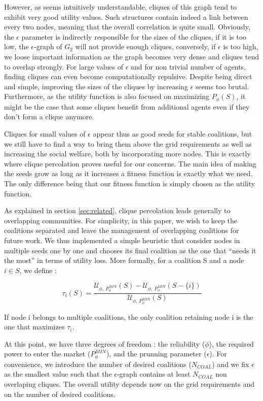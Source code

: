 \documentclass[conference]{IEEEtran}
\begin{document}
However, as seems intuitively understandable, cliques of this graph tend to exhibit very good utility values. Such  structures contain indeed a link between every two nodes, meaning that the overall correlation is quite small. Obviously, the $ \epsilon $ parameter is indirectly responsible for the sizes of the cliques, if it is too low, the $\epsilon$-graph of $ G_{2} $ will not provide enough cliques, conversely, if $\epsilon $ is too high, we loose important information as the graph becomes very dense and cliques tend to overlap strongly. For large values of $ \epsilon $ and for non trivial number of agents, finding cliques can even become computationally repulsive. Despite being direct and simple, improving the sizes of the cliques by increasing $ \epsilon $ seems too brutal. Furthermore, as the utility function is also focused on maximizing $ P_{\phi}(S) $, it might be the case that some cliques benefit from additional agents even if they don't form a clique anymore.

Cliques for small values of $ \epsilon $ appear thus as good seeds for stable coalitions, but we still have to find a way to bring them above the grid requirements as well as increasing the social welfare, both by incorporating more nodes. This is exactly where clique percolation proves useful for our concerns. The main idea of making the seeds grow as long as it increases a fitness function is exactly what we need. The only difference being that our fitness function is simply chosen as the utility function.  

As explained in section \ref{sec:related}, clique percolation leads generally to overlapping communities. For simplicity, in this paper, we wish to keep the coalitions separated and  leave the management of overlapping coalitions for future work. We thus implemented a simple heuristic that consider nodes in multiple seeds one by one and chooses its final coalition as the one that “needs it the most” in terms of utility loss. More formally, for a coalition S and a node $ i \in S $, we define :

\begin{equation}
\tau_{i}(S) = \dfrac{\mathcal{U}_{\phi,\ P_{\phi}^{MIN}}(S) - \mathcal{U}_{\phi,\ P_{\phi}^{MIN}}(S-\{i\}) }{\mathcal{U}_{\phi,\ P_{\phi}^{MIN}}(S)}
\label{tau}
\end{equation}

If node i belongs to  multiple coalitions, the only coalition retaining node i is the one that maximizes $ \tau_{i} $.

At this point, we have three degrees of freedom : the reliability ($ \phi $), the required power to enter the market ($P_{\phi}^{MIN}$), and the prunning parameter ($\epsilon$). For convenience, we introduce the number of desired coalitions ($ N_{COAL} $) and we fix $\epsilon $ as the smallest value such that the $ \epsilon $-graph contains at least $ N_{COAL} $ non overlaping cliques. The overall utility depends now on the grid requirements and on the number of desired coalitions.
\end{document}
